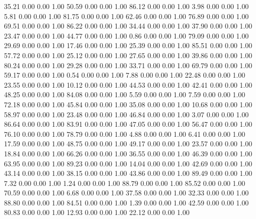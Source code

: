    35.21   0.00   0.00   1.00
   50.59   0.00   0.00   1.00
   86.12   0.00   0.00   1.00
    3.98   0.00   0.00   1.00
    5.81   0.00   0.00   1.00
   81.75   0.00   0.00   1.00
   62.46   0.00   0.00   1.00
   76.89   0.00   0.00   1.00
   69.51   0.00   0.00   1.00
   86.22   0.00   0.00   1.00
   34.44   0.00   0.00   1.00
   37.90   0.00   0.00   1.00
   23.47   0.00   0.00   1.00
   44.77   0.00   0.00   1.00
    0.86   0.00   0.00   1.00
   79.09   0.00   0.00   1.00
   29.69   0.00   0.00   1.00
   17.46   0.00   0.00   1.00
   25.39   0.00   0.00   1.00
   85.51   0.00   0.00   1.00
   57.72   0.00   0.00   1.00
   25.12   0.00   0.00   1.00
   27.65   0.00   0.00   1.00
   39.86   0.00   0.00   1.00
   80.24   0.00   0.00   1.00
   29.28   0.00   0.00   1.00
   33.71   0.00   0.00   1.00
   69.79   0.00   0.00   1.00
   59.17   0.00   0.00   1.00
    0.54   0.00   0.00   1.00
    7.88   0.00   0.00   1.00
   22.48   0.00   0.00   1.00
   23.55   0.00   0.00   1.00
   10.12   0.00   0.00   1.00
   44.53   0.00   0.00   1.00
   42.41   0.00   0.00   1.00
   48.25   0.00   0.00   1.00
   84.08   0.00   0.00   1.00
    5.59   0.00   0.00   1.00
    7.59   0.00   0.00   1.00
   72.18   0.00   0.00   1.00
   45.84   0.00   0.00   1.00
   35.08   0.00   0.00   1.00
   10.68   0.00   0.00   1.00
   58.97   0.00   0.00   1.00
   23.48   0.00   0.00   1.00
   46.84   0.00   0.00   1.00
    3.07   0.00   0.00   1.00
   86.64   0.00   0.00   1.00
   83.91   0.00   0.00   1.00
   47.05   0.00   0.00   1.00
   56.47   0.00   0.00   1.00
   76.10   0.00   0.00   1.00
   78.79   0.00   0.00   1.00
    4.88   0.00   0.00   1.00
    6.41   0.00   0.00   1.00
   17.59   0.00   0.00   1.00
   48.75   0.00   0.00   1.00
   49.17   0.00   0.00   1.00
   23.57   0.00   0.00   1.00
   18.84   0.00   0.00   1.00
   66.26   0.00   0.00   1.00
   36.55   0.00   0.00   1.00
   46.39   0.00   0.00   1.00
   63.95   0.00   0.00   1.00
   89.23   0.00   0.00   1.00
   14.04   0.00   0.00   1.00
   42.69   0.00   0.00   1.00
   43.14   0.00   0.00   1.00
   38.15   0.00   0.00   1.00
   43.86   0.00   0.00   1.00
   89.49   0.00   0.00   1.00
    7.32   0.00   0.00   1.00
    1.24   0.00   0.00   1.00
   88.79   0.00   0.00   1.00
   85.52   0.00   0.00   1.00
   70.59   0.00   0.00   1.00
    6.68   0.00   0.00   1.00
   37.58   0.00   0.00   1.00
   32.33   0.00   0.00   1.00
   88.80   0.00   0.00   1.00
   84.51   0.00   0.00   1.00
    1.39   0.00   0.00   1.00
   42.59   0.00   0.00   1.00
   80.83   0.00   0.00   1.00
   12.93   0.00   0.00   1.00
   22.12   0.00   0.00   1.00
